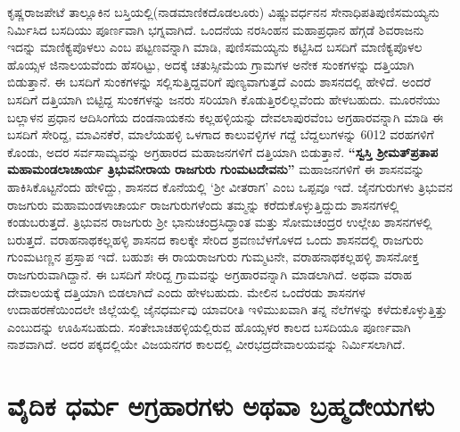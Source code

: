 ಕೃಷ್ಣರಾಜಪೇಟೆ ತಾಲ್ಲೂಕಿನ ಬಸ್ತಿಯಲ್ಲಿ(ನಾಡಮಾಣಿಕದೊಡಲೂರು) ವಿಷ್ಣುವರ್ಧನನ ಸೇನಾಧಿಪತಿ\break ಪುಣಿಸಮಯ್ಯನು ನಿರ್ಮಿಸಿದ ಬಸದಿಯು ಪೂರ್ಣವಾಗಿ ಭಗ್ನವಾಗಿದೆ. ಒಂದನೆಯ ನರಸಿಂಹನ ಮಹಾಪ್ರಧಾನ ಹೆಗ್ಗಡೆ ಶಿವರಾಜನು ಇದನ್ನು ಮಾಣಿಕ್ಯಪೊಳಲು ಎಂಬ ಪಟ್ಟಣವನ್ನಾಗಿ ಮಾಡಿ, ಪುಣಿಸಮಯ್ಯನು ಕಟ್ಟಿಸಿದ ಬಸದಿಗೆ ಮಾಣಿಕ್ಯಪೊಳಲ ಹೊಯ್ಸಳ ಜಿನಾಲಯವೆಂದು ಹೆಸರಿಟ್ಟು, ಅದಕ್ಕೆ ಚತುಸ್ಸೀಮೆಯ ಗ್ರಾಮಗಳ ಅನೇಕ ಸುಂಕಗಳನ್ನು ದತ್ತಿಯಾಗಿ ಬಿಡುತ್ತಾನೆ. ಈ ಬಸದಿಗೆ ಸುಂಕಗಳನ್ನು ಸಲ್ಲಿಸುತ್ತಿದ್ದವರಿಗೆ ಪುಣ್ಯವಾಗುತ್ತದೆ ಎಂದು ಶಾಸನದಲ್ಲಿ ಹೇಳಿದೆ. ಅಂದರೆ ಬಸದಿಗೆ ದತ್ತಿಯಾಗಿ ಬಿಟ್ಟಿದ್ದ ಸುಂಕಗಳನ್ನು ಜನರು ಸರಿಯಾಗಿ ಕೊಡುತ್ತಿರಲಿಲ್ಲವೆಂದು ಹೇಳಬಹುದು. ಮೂರನೆಯು ಬಲ್ಲಾಳನ ಪ್ರಧಾನ ಆದಿಸಿಂಗೆಯ ದಂಡನಾಯಕನು ಕಲ್ಲಹಳ್ಳಿಯನ್ನು ದೇವಲಾಪುರವೆಂಬ ಅಗ್ರಹಾರವನ್ನಾಗಿ ಮಾಡಿ ಈ ಬಸದಿಗೆ ಸೇರಿದ್ದ, ಮಾವಿನಕೆರೆ, ಮಾಲೆಯಹಳ್ಳಿ ಒಳಗಾದ ಕಾಲುವಳ್ಳಿಗಳ ಗದ್ದೆ ಬೆದ್ದಲುಗಳನ್ನು 6012 ವರಹಗಳಿಗೆ ಕೊಂಡು, ಅದರ ಸರ್ವಸಾಮ್ಯವನ್ನು ಅಗ್ರಹಾರದ ಮಹಾಜನಗಳಿಗೆ ದತ್ತಿಯಾಗಿ ಬಿಡುತ್ತಾನೆ. \textbf{“ಸ್ವಸ್ತಿ ಶ‍್ರೀಮತ್​ ಪ್ರತಾಪ ಮಹಾಮಂಡಲಾಚಾರ್ಯ ತ್ರಿಭುವನೀರಾಯ ರಾಜಗುರು ಗುಂಮಟದೇವನು”} ಮಹಾಜನಗಳಿಗೆ ಈ ಶಾಸನವನ್ನು ಹಾಕಿಸಿಕೊಟ್ಟ\-ನೆಂದು ಹೇಳಿದ್ದು, ಶಾಸನದ ಕೊನೆಯಲ್ಲಿ `ಶ‍್ರೀ ವೀತರಾಗ' ಎಂಬ ಒಪ್ಪವೂ ಇದೆ. ಜೈನಗುರುಗಳು ತ್ರಿಭುವನ ರಾಜಗುರು ಮಹಾಮಂಡಳಾಚಾರ್ಯ ರಾಜಗುರುಗಳೆಂದು ತಮ್ಮನ್ನು ಕರೆದುಕೊಳ್ಳುತ್ತಿದ್ದುದು ಶಾಸನಗಳಲ್ಲಿ ಕಂಡುಬರುತ್ತದೆ. ತ್ರಿಭುವನ ರಾಜಗುರು ಶ‍್ರೀ ಭಾನುಚಂದ್ರಸಿದ್ಧಾಂತ ಮತ್ತು ಸೋಮಚಂದ್ರರ ಉಲ್ಲೇಖ ಶಾಸನಗಳಲ್ಲಿ ಬರುತ್ತದೆ. ವರಾಹನಾಥಕಲ್ಲಹಳ್ಳಿ ಶಾಸನದ ಕಾಲಕ್ಕೇ ಸೇರಿದ ಶ್ರವಣಬೆಳಗೊಳದ ಒಂದು ಶಾಸನದಲ್ಲಿ ರಾಜಗುರು ಗುಂಮಟಣ್ಣನ ಪ್ರಸ್ತಾಪ ಇದೆ. ಬಹುಶಃ ಈ ರಾಯರಾಜಗುರು ಗುಮ್ಮಟನೇ, ವರಾಹನಾಥಕಲ್ಲಹಳ್ಳಿ ಶಾಸನೋಕ್ತ ರಾಜಗುರುವಾಗಿದ್ದಾನೆ. ಈ ಬಸದಿಗೆ ಸೇರಿದ್ದ ಗ್ರಾಮವನ್ನು ಅಗ್ರಹಾರವನ್ನಾಗಿ ಮಾಡಲಾಗಿದೆ. ಅಥವಾ ವರಾಹ ದೇವಾಲಯಕ್ಕೆ ದತ್ತಿಯಾಗಿ ಬಿಡಲಾಗಿದೆ ಎಂದು ಹೇಳಬಹುದು. ಮೇಲಿನ ಒಂದೆರಡು ಶಾಸನಗಳ ಉದಾಹರಣೆಯಿಂದಲೇ ಜಿಲ್ಲೆಯಲ್ಲಿ ಜೈನಧರ್ಮವು ಯಾವರೀತಿ ಇಳಿಮುಖವಾಗಿ ತನ್ನ ನೆಲೆಗಳನ್ನು ಕಳೆದುಕೊಳ್ಳುತ್ತಿತ್ತು ಎಂಬುದನ್ನು ಊಹಿಸಬಹುದು. ಸಂತೇಬಾಚಹಳ್ಳಿಯಲ್ಲಿರುವ ಹೊಯ್ಸಳರ ಕಾಲದ ಬಸದಿಯೂ ಪೂರ್ಣವಾಗಿ ನಾಶವಾಗಿದೆ. ಅದರ ಪಕ್ಕದಲ್ಲಿಯೇ ವಿಜಯನಗರ ಕಾಲದಲ್ಲಿ ವೀರಭದ್ರದೇವಾಲಯವನ್ನು ನಿರ್ಮಿಸಲಾಗಿದೆ.

\section*{ವೈದಿಕ ಧರ್ಮ \enginline{-} ಅಗ್ರಹಾರಗಳು ಅಥವಾ ಬ್ರಹ್ಮದೇಯಗಳು}

